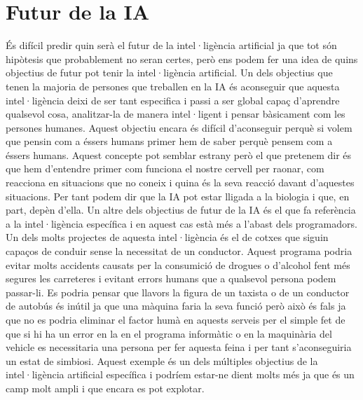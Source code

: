 \section {Futur de la IA}
És difícil predir quin serà el futur de la intel·ligència artificial ja que tot són hipòtesis que probablement no seran certes, però ens podem fer una idea de quins objectius de futur
pot tenir la intel·ligència artificial.
Un dels objectius que tenen la majoria de persones que treballen en la IA és aconseguir que aquesta intel·ligència deixi de ser tant especifica i passi a ser global capaç d'aprendre
qualsevol cosa, analitzar-la de manera intel·ligent i pensar bàsicament com les persones humanes. Aquest objectiu encara és difícil d'aconseguir perquè si volem que pensin com a éssers
humans primer hem de saber perquè pensem com a éssers humans. Aquest concepte pot semblar estrany però el que pretenem dir és que hem d'entendre primer com funciona el nostre cervell
per raonar, com reacciona en situacions que no coneix i quina és la seva reacció davant d'aquestes situacions. Per tant podem dir que la IA pot estar lligada a la biologia i que, en part,
depèn d'ella.
Un altre dels objectius de futur de la IA és el que fa referència a la intel·ligència específica i en aquest cas està més a l'abast dels programadors. Un dels molts projectes de aquesta
intel·ligència és el de cotxes que siguin capaços de conduir sense la necessitat de un conductor. Aquest programa podria evitar molts accidents causats per la consumició de drogues o
d'alcohol fent més segures les carreteres i evitant errors humans que a qualsevol persona podem passar-li. Es podria pensar que llavors la figura de un taxista o de un conductor de
autobús és inútil ja que una màquina faria la seva funció però això és fals ja que no es podria eliminar el factor humà en aquests serveis per el simple fet de que si hi ha un error en la
en el programa informàtic o en la maquinària del vehicle es necessitaria una persona per fer aquesta feina i per tant s'aconseguiria un estat de simbiosi. Aquest exemple és un dels múltiples
objectius de la intel·ligència artificial específica i podríem estar-ne dient molts més ja que és un camp molt ampli i que encara es pot explotar.


